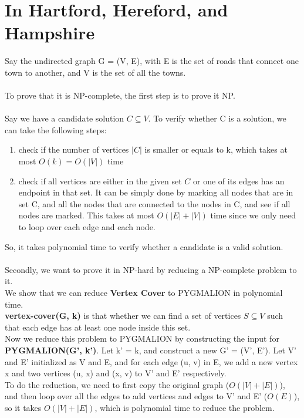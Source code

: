\documentclass[a4paper]{article}
\begin{document}
\section{In Hartford, Hereford, and Hampshire}
Say the undirected graph G = (V, E), with E is the set of
roads that connect one town to another, and V is the set of
all the towns. \\
\\
To prove that it is NP-complete, the first step
is to prove it NP.\\
\\
Say we have a candidate solution $C \subseteq V$. To verify whether
C is a solution, we can take the following steps:
\begin{enumerate}
	\item check if the number of vertices $|C|$ is smaller or equals to k, which takes at most $O(k) = O(|V|)$ time
	\item check if all vertices are either in the given set $C$ or one of its edges has an endpoint in
	that set. It can be simply done by marking all nodes that are in set C, and all the nodes that are connected to
	the nodes in C, and see if all nodes are marked. This takes at most $O(|E| + |V|)$ time since we only need to loop
	over each edge and each node.

\end{enumerate}
So, it takes polynomial time to verify whether a candidate is a valid solution.\\
\\
Secondly, we want to prove it in NP-hard by reducing a NP-complete problem to it. \\
We show that we can reduce \textbf{Vertex Cover} to PYGMALION in polynomial time. \\
\textbf{vertex-cover(G, k)} is that whether we can find a set of vertices $S \subseteq V$
such that each edge has at least one node inside this set. \\
Now we reduce this problem to PYGMALION by constructing the input for \textbf{PYGMALION(G', k')}.
Let k' = k, and construct a new G' = (V', E'). Let V' and E' initialized as V and E,
and for each edge (u, v) in E, we add a new vertex x and two vertices (u, x) and (x, v)
to V' and E' respectively. \\
To do the reduction, we need to first copy the original graph ($O(|V| + |E|)$), and then loop over all the
edges to add vertices and edges to V' and E' ($O(E)$), so it takes $O(|V|+|E|)$, which is polynomial time to
reduce the problem.\\
\end{document}
